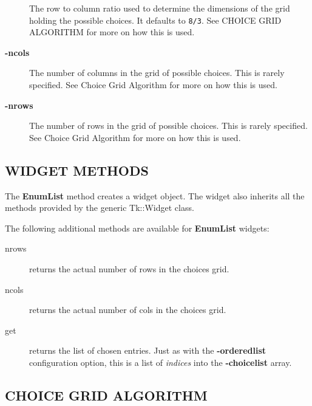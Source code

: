 \documentclass{article}
\begin{document}
\begin{description}
The row to column ratio used to determine the dimensions of the grid
holding the possible choices.  It defaults to \texttt{8/3}.  See \textsf{CHOICE GRID ALGORITHM} for more on how this is used.


\item[{\textbf{-ncols}}] \mbox{}

The number of columns in the grid of possible choices.  This is rarely
specified.  See \textsf{Choice Grid Algorithm} for more on how this is
used.


\item[{\textbf{-nrows}}] \mbox{}

The number of rows in the grid of possible choices.  This is rarely
specified.  See \textsf{Choice Grid Algorithm} for more on how this is
used.

\end{description}
\subsection*{WIDGET METHODS\label{Tk::EnumList_WIDGET_METHODS}}


The \textbf{EnumList} method creates a widget object. The widget
also inherits all the methods provided by the generic Tk::Widget
class.



The following additional methods are available for \textbf{EnumList} widgets:

\begin{description}

\item[{nrows}] \mbox{}

returns the actual number of rows in the choices grid.


\item[{ncols}] \mbox{}

returns the actual number of cols in the choices grid.


\item[{get}] \mbox{}

returns the list of chosen entries.  Just as with the \textbf{-orderedlist}
configuration option, this is a list of \textit{indices} into the
\textbf{-choicelist} array.

\end{description}
\subsection*{CHOICE GRID ALGORITHM\label{Tk::EnumList_CHOICE_GRID_ALGORITHM}}
\end{document}
